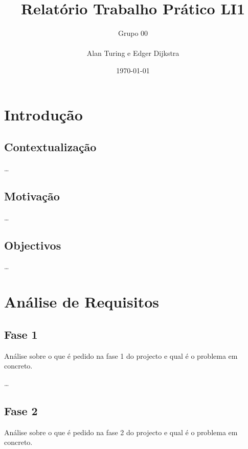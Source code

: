\documentclass[a4paper]{report} %
\begin{document}
\title{Relatório Trabalho Prático LI1}
\author{Grupo 00\\
\\
Alan Turing e Edger Dijkstra}
\date{\today}

\maketitle

\tableofcontents

\listoffigures

\listoftables

\chapter{Introdução}

  \section{Contextualização}
  \ldots

  \section{Motivação}
  \ldots
  
  \section{Objectivos}
  \ldots

\chapter{Análise de Requisitos}


\section{Fase 1}
\label{sec:analisefase1}

Análise sobre o que é pedido na fase 1 do projecto e qual é o problema em concreto.

\ldots

\section{Fase 2}
\label{sec:analisefasee}

Análise sobre o que é pedido na fase 2 do projecto e qual é o problema em concreto.
\end{document}

